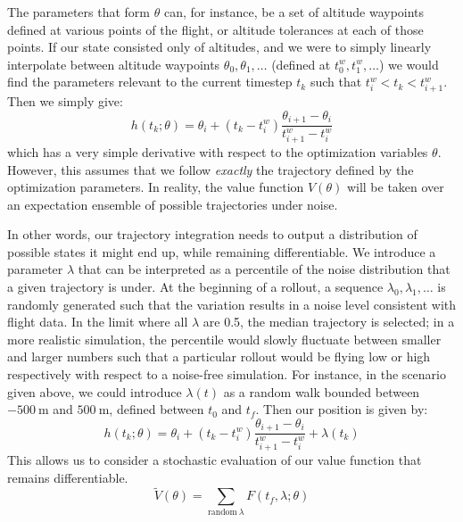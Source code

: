\documentclass[11pt]{scrartcl} %
\begin{document}
The parameters that form $\theta$ can, for instance, be a set of altitude waypoints defined at various points of the flight, or altitude tolerances at each of those points. If our state consisted only of altitudes, and we were to simply linearly interpolate between altitude waypoints $\theta_0, \theta_1, \dots$ (defined at $t^w_0, t^w_1, \dots$) we would find the parameters relevant to the current timestep $t_k$ such that $t^w_i < t_k < t^w_{i+1}$. Then we simply give:
\[h(t_k; \theta) = \theta_i + (t_k - t_i^w) \frac{\theta_{i+1}-\theta_i}{t_{i+1}^w - t^w_i}\]
which has a very simple derivative with respect to the optimization variables $\theta$. However, this assumes that we follow \emph{exactly} the trajectory defined by the optimization parameters. In reality, the value function $V(\theta)$ will be taken over an expectation ensemble of possible trajectories under noise.

In other words, our trajectory integration needs to output a distribution of possible states it might end up, while remaining differentiable. We introduce a parameter $\lambda$ that can be interpreted as a percentile of the noise distribution that a given trajectory is under. At the beginning of a rollout, a sequence $\lambda_0, \lambda_1, \dots$ is randomly generated such that the variation results in a noise level consistent with flight data. In the limit where all $\lambda$ are 0.5, the median trajectory is selected; in a more realistic simulation, the percentile would slowly fluctuate between smaller and larger numbers such that a particular rollout would be flying low or high respectively with respect to a noise-free simulation. For instance, in the scenario given above, we could introduce $\lambda(t)$ as a random walk bounded between $-500~\textrm{m}$ and $500~\textrm{m}$, defined between $t_0$ and $t_f$. Then our position is given by:
\[h(t_k; \theta) = \theta_i + (t_k - t_i^w) \frac{\theta_{i+1}-\theta_i}{t_{i+1}^w - t^w_i} + \lambda(t_k)\]
This allows us to consider a stochastic evaluation of our value function that remains differentiable.
\[\tilde V(\theta)=\sum_{\textrm{random}~\lambda} F(t_f, \lambda; \theta)\]
\end{document}
